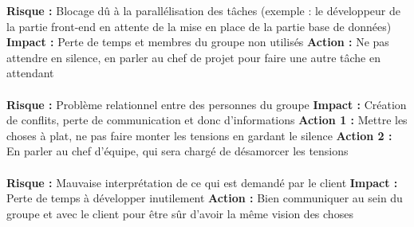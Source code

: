 \textbf{Risque : } Blocage dû à la parallélisation des tâches (exemple : le développeur de la partie
front-end en attente de la mise en place de la partie base de données)
\newline
\textbf{Impact : } Perte de temps et membres du groupe non utilisés
\newline
\textbf{Action : } Ne pas attendre en silence, en parler au chef de projet pour faire une autre tâche
en attendant

\paragraph{}

\textbf{Risque : } Problème relationnel entre des personnes du groupe
\newline
\textbf{Impact : } Création de conflits, perte de communication et donc d’informations
\newline
\textbf{Action 1 : } Mettre les choses à plat, ne pas faire monter les tensions en gardant le silence
\newline
\textbf{Action 2 : } En parler au chef d’équipe, qui sera chargé de désamorcer les tensions

\paragraph{}

\textbf{Risque : } Mauvaise interprétation de ce qui est demandé par le client
\newline
\textbf{Impact : } Perte de temps à développer inutilement
\newline
\textbf{Action : } Bien communiquer au sein du groupe et avec le client pour être sûr d’avoir la même vision des choses













